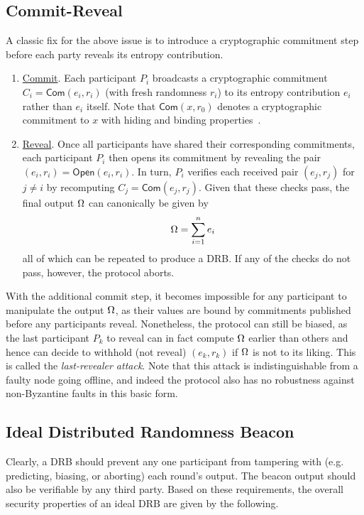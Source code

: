 \subsection{Commit-Reveal}
\label{subsection:commit-reveal}
A classic fix for the above issue is to introduce a cryptographic commitment step before each party reveals its entropy contribution.
\begin{enumerate}
\item \underline{Commit}. Each participant $P_i$ broadcasts a cryptographic commitment $C_i = \mathsf{Com}(e_i, r_i)$ (with fresh randomness $r_i$) to its entropy contribution $e_i$ rather than $e_i$ itself. Note that $\mathsf{Com}(x, r_0)$ denotes a cryptographic commitment to $x$ with hiding and binding properties~\cite{blum1983coin,damgaard1998commitment}.
\item \underline{Reveal}. Once all participants have shared their corresponding commitments, each participant $P_i$ then opens its commitment by revealing the pair $(e_i, r_i) = \mathsf{Open}(e_i, r_i)$. In turn, $P_i$ verifies each received pair $(e_j, r_j)$ for $j \neq i$ by recomputing $C_j = \mathsf{Com}(e_j, r_j)$. Given that these checks pass, the final output $\Omega$ can canonically be given by
\[
\Omega = \sum_{i = 1}^n e_i
\]
all of which can be repeated to produce a DRB. If any of the checks do not pass, however, the protocol aborts.
\end{enumerate}

With the additional commit step, it becomes impossible for any participant to manipulate the output $\Omega$, as their values are bound by commitments published before any participants reveal. Nonetheless, the protocol can still be biased, as the last participant $P_k$ to reveal can in fact compute $\Omega$ earlier than others and hence can decide to withhold (not reveal) $(e_k, r_k)$ if $\Omega$ is not to its liking. This is called the \textit{last-revealer attack}. Note that this attack is indistinguishable from a faulty node going offline, and indeed the protocol also has no robustness against non-Byzantine faults in this basic form.

\subsection{Ideal Distributed Randomness Beacon}
Clearly, a DRB should prevent any one participant from tampering with (e.g. predicting, biasing, or aborting) each round's output. The beacon output should also be verifiable by any third party. Based on these requirements, the overall security properties of an ideal DRB are given by the following.

